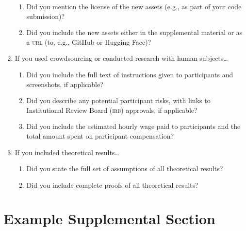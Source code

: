 \documentclass[11pt]{article}
\begin{document}
\begin{enumerate}
  \begin{enumerate}
    \item Did you mention the license of the new assets (e.g., as part of your code submission)?
    \answerTODO{}
    \item Did you include the new assets either in the supplemental material or as
    a \textsc{url} (to, e.g., GitHub or Hugging Face)?
    \answerTODO{}
  \end{enumerate}
\item If you used crowdsourcing or conducted research with human subjects\dots
  \begin{enumerate}
  \item Did you include the full text of instructions given to participants and
    screenshots, if applicable?
    \answerTODO{}
  \item Did you describe any potential participant risks, with links to
    Institutional Review Board (\textsc{irb}) approvals, if applicable?
    \answerTODO{}
  \item Did you include the estimated hourly wage paid to participants and the
    total amount spent on participant compensation?
    \answerTODO{}
  \end{enumerate}
\item If you included theoretical results\dots
  \begin{enumerate}
  \item Did you state the full set of assumptions of all theoretical results?
    \answerTODO{}
  \item Did you include complete proofs of all theoretical results?
    \answerTODO{}
  \end{enumerate}
\end{enumerate}

\newpage
\appendix


\section{Example Supplemental Section}
\end{document}
